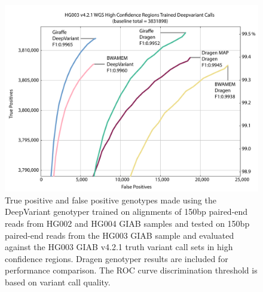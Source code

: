 \documentclass[11pt]{ucscthesis}
\begin{document}
\begin{figure}[p]
    \centering
    \includegraphics[width=\linewidth]{HG003_trained_deepvariant_genotyping.pdf}
    \caption[Genotyping evaluation for the DeepVariant genotyper with projected mappings from Giraffe and other mappers]{True positive and false positive genotypes made using the DeepVariant genotyper trained on alignments of 150bp paired-end reads from HG002 and HG004 GIAB samples and tested on 150bp paired-end reads from the HG003 GIAB sample and evaluated against the HG003 GIAB v4.2.1 truth variant call sets in high confidence regions. Dragen genotyper results are included for performance comparison. The ROC curve discrimination threshold is based on variant call quality.}
    \label{fig:trained_deepvariant_genotyping}
\end{figure}
\end{document}
